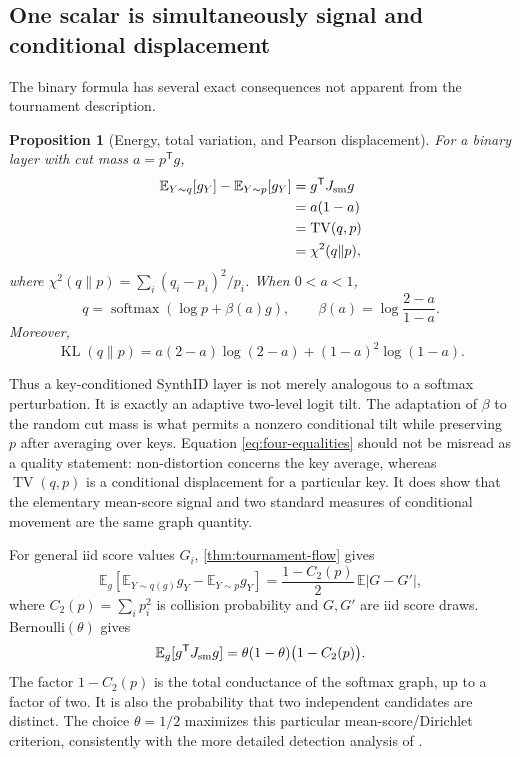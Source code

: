 \documentclass[11pt]{article}
\newtheorem{proposition}[theorem]{Proposition}
\theoremstyle{definition}
\theoremstyle{remark}
\DeclareMathOperator{\softmax}{softmax}
\DeclareMathOperator{\KL}{KL}
\DeclareMathOperator{\TV}{TV}
\newcommand{\E}{\mathbb{E}}
\newcommand{\trans}{\mathsf{T}}
\begin{document}
\subsection{One scalar is simultaneously signal and conditional displacement}

The binary formula has several exact consequences not apparent from the tournament description.

\begin{proposition}[Energy, total variation, and Pearson displacement]
\label{prop:binary-metrics}
For a binary layer with cut mass $a=p^\trans g$,
\begin{equation}
\begin{split}
\E_{Y\sim q}[g_Y]-\E_{Y\sim p}[g_Y]
&=g^\trans J_{\rm sm}g\\
&=a(1-a)\\
&=\TV(q,p)\\
&=\chi^2(q\|p),
\end{split}
\label{eq:four-equalities}
\end{equation}
where $\chi^2(q\|p)=\sum_i(q_i-p_i)^2/p_i$. When $0<a<1$,
\begin{equation}
q=\softmax(\log p+\beta(a)g),
\qquad
\beta(a)=\log\frac{2-a}{1-a}.
\label{eq:adaptive-softmax-tilt}
\end{equation}
Moreover,
\begin{equation}
\KL(q\|p)
=a(2-a)\log(2-a)+(1-a)^2\log(1-a).
\label{eq:binary-kl}
\end{equation}
\end{proposition}

Thus a key-conditioned SynthID layer is not merely analogous to a softmax perturbation. It is exactly an adaptive two-level logit tilt. The adaptation of $\beta$ to the random cut mass is what permits a nonzero conditional tilt while preserving $p$ after averaging over keys. Equation \eqref{eq:four-equalities} should not be misread as a quality statement: non-distortion concerns the key average, whereas $\TV(q,p)$ is a conditional displacement for a particular key. It does show that the elementary mean-score signal and two standard measures of conditional movement are the same graph quantity.

For general iid score values $G_i$, \cref{thm:tournament-flow} gives
\begin{equation}
\E_g\left[\E_{Y\sim q(g)}g_Y-\E_{Y\sim p}g_Y\right]
=\frac{1-C_2(p)}{2}\,\E|G-G'|,
\label{eq:general-score-gain}
\end{equation}
where $C_2(p)=\sum_i p_i^2$ is collision probability and $G,G'$ are iid score draws. Bernoulli$(\theta)$ gives
\begin{equation}
\E_g[g^\trans J_{\rm sm}g]
=\theta(1-\theta)\big(1-C_2(p)\big).
\label{eq:bernoulli-expected-energy}
\end{equation}
The factor $1-C_2(p)$ is the total conductance of the softmax graph, up to a factor of two. It is also the probability that two independent candidates are distinct. The choice $\theta=1/2$ maximizes this particular mean-score/Dirichlet criterion, consistently with the more detailed detection analysis of \citet{omidi2026synthid}.
\end{document}
